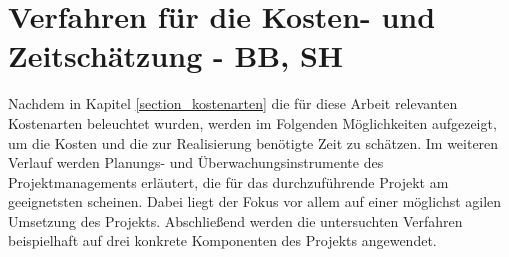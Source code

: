 
\section{Verfahren für die Kosten- und Zeitschätzung - BB, SH}

\label{section_verfahren_schaetzung} %
Nachdem in Kapitel \ref{section_kostenarten} die für diese Arbeit relevanten Kostenarten 
beleuchtet wurden, werden im Folgenden Möglichkeiten aufgezeigt, um die Kosten 
und die zur Realisierung benötigte Zeit zu schätzen. Im weiteren Verlauf werden 
Planungs- und Überwachungsinstrumente des Projektmanagements erläutert, die für 
das durchzuführende Projekt am geeignetsten scheinen. Dabei liegt der Fokus vor 
allem auf einer möglichst agilen Umsetzung des Projekts. Abschließend werden 
die untersuchten Verfahren beispielhaft auf drei konkrete Komponenten des Projekts 
angewendet.





